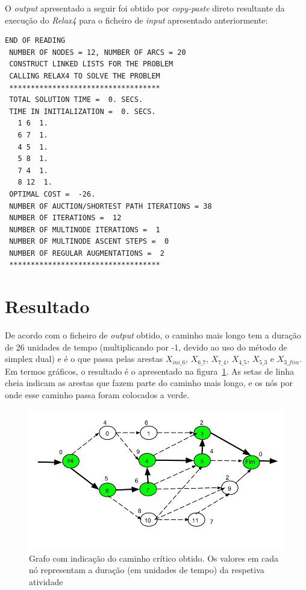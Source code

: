 O \emph{output} apresentado a seguir foi obtido por \emph{copy-paste} direto
resultante da execução do \emph{Relax4} para
o ficheiro de \emph{input} apresentado anteriormente:

\begin{verbatim}
END OF READING
 NUMBER OF NODES = 12, NUMBER OF ARCS = 20
 CONSTRUCT LINKED LISTS FOR THE PROBLEM
 CALLING RELAX4 TO SOLVE THE PROBLEM
 ***********************************
 TOTAL SOLUTION TIME =  0. SECS.
 TIME IN INITIALIZATION =  0. SECS.
   1 6  1.
   6 7  1.
   4 5  1.
   5 8  1.
   7 4  1.
   8 12  1.
 OPTIMAL COST =  -26.
 NUMBER OF AUCTION/SHORTEST PATH ITERATIONS = 38
 NUMBER OF ITERATIONS =  12
 NUMBER OF MULTINODE ITERATIONS =  1
 NUMBER OF MULTINODE ASCENT STEPS =  0
 NUMBER OF REGULAR AUGMENTATIONS =  2
 ***********************************
\end{verbatim}

\newpage

\section{Resultado}

De acordo com o ficheiro de \emph{output} obtido, o caminho mais longo tem
a duração de 26 unidades de tempo (multiplicando por -1, devido ao uso do método
de simplex dual) e é o que passa pelas arestas $X_{ini\_6}$,
$X_{6\_7}$, $X_{7\_4}$, $X_{4\_5}$, $X_{5\_3}$ e $X_{3\_fim}$. Em termos
gráficos, o resultado é o apresentado na figura~\ref{p1:fig:caminho_critico}. As
setas de linha cheia indicam as arestas que fazem parte do caminho mais longo,
e os nós por onde esse caminho passa foram colocados a verde.

\begin{figure}[<+htpb+>]
\centering
		  \includegraphics[scale=0.5]{./img/p1_caminho_critico}
\caption{Grafo com indicação do caminho crítico obtido. Os valores em cada nó
representam a duração (em unidades de tempo) da respetiva atividade}
\label{p1:fig:caminho_critico}
\end{figure}

